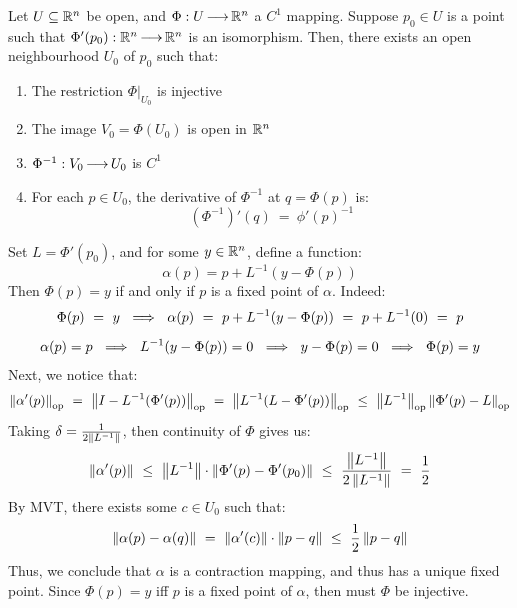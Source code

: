 \newpage
\begin{thm}[num=7.4,title=Inverse Function Theorem]
    Let $ U \subseteq \mathbb{R}^{n} $ be open, and $ \Phi: U \operatorname{\longrightarrow} \mathbb{R}^{n} $ a
    $ C^{1} $ mapping. Suppose $ p_{0} \in U $ is a point such that
    $ \Phi'(p_{0}): \mathbb{R}^{n} \operatorname{\longrightarrow} \mathbb{R}^{n} $ is an isomorphism. Then, there
    exists an open neighbourhood $ U_{0} $ of $ p_{0} $ such that:
    \begin{enumerate}
        \item The restriction $ \Phi\rvert_{U_{0}} $ is injective
        \item The image $ V_{0} = \Phi(U_{0}) $ is open in $ \mathbb{R}^{n} $
        \item $ \Phi^{-1}:V_{0} \operatorname{\longrightarrow} U_{0} $ is $ C^{1} $
        \item For each $ p \in U_{0} $, the derivative of $ \Phi^{-1} $ at
            $ q = \Phi(p) $ is:
            \begin{equation*}
                (\Phi^{-1})'(q) \ = \ \phi'(p)^{-1}
            \end{equation*}
    \end{enumerate}
\end{thm}

\begin{pf}[title=Item 1]
    Set $ L = \Phi'(p_{0}) $, and for some $ y \in \mathbb{R}^{n} $, define a function:
    \begin{equation*}
        \alpha(p) = p + L^{-1}(y-\Phi(p))
    \end{equation*}
    Then $ \Phi(p) = y $ if and only if $ p $ is a fixed point of $ \alpha $.
    Indeed:
    \begin{gather*}
        \Phi(p) \ = \ y \ \implies \ \alpha(p) \ = \ p + L^{-1}(y - \Phi(p))
        \ = \ p + L^{-1}(0) \ = \ p \vsp
        \alpha(p) = p \ \implies \ L^{-1}(y-\Phi(p)) = 0
        \ \implies \ y - \Phi(p) = 0 \ \implies \ \Phi(p) = y
    \end{gather*}
    Next, we notice that:
    \begin{equation*}
        \left\|\alpha'(p)\right\|_{\textrm{op}} \ = \ \left\|I - L^{-1}(\Phi'(p))\right\|_{\textrm{op}}
        \ = \ \left\|L^{-1}(L-\Phi'(p))\right\|_{\textrm{op}} \ \leq \
        \left\|L^{-1}\right\|_{\textrm{op}}\left\|\Phi'(p)-L\right\|_{\textrm{op}}
    \end{equation*}
    Taking $ \delta = \frac{1}{2\left\|L^{-1}\right\|} $, then continuity of $ \Phi $
    gives us:
    \begin{equation*}
        \norm{\alpha'(p)} \ \leq \ \norm{L^{-1}}\cdot\norm{\Phi'(p)-\Phi'(p_{0})}
        \ \leq \ \frac{\norm{L^{-1}}}{2\norm{L^{-1}}} \ = \ \frac{1}{2}
    \end{equation*}
    By MVT, there exists some $ c \in U_{0} $ such that:
    \begin{equation*}
        \norm{\alpha(p)-\alpha(q)} \ = \ \norm{\alpha'(c)}\cdot\norm{p-q}
        \ \leq \ \frac{1}{2}\norm{p-q}
    \end{equation*}
    Thus, we conclude that $ \alpha $ is a contraction mapping, and thus has a
    unique fixed point. Since $ \Phi(p)=y $ iff $ p $ is a fixed point of
    $ \alpha $, then must $ \Phi $ be injective.
\end{pf}

